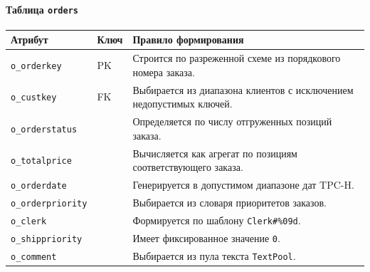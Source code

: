 \paragraph{Таблица \texttt{orders}}
\begin{center}
\small
\begin{tabular}{|p{}|p{}|p{}|}
\hline
\textbf{Атрибут} & \textbf{Ключ} & \textbf{Правило формирования} \\
\hline
\texttt{o\_orderkey} & PK & Строится по разреженной схеме из порядкового номера заказа. \\
\hline
\texttt{o\_custkey} & FK & Выбирается из диапазона клиентов с исключением недопустимых ключей. \\
\hline
\texttt{o\_orderstatus} &  & Определяется по числу отгруженных позиций заказа. \\
\hline
\texttt{o\_totalprice} &  & Вычисляется как агрегат по позициям соответствующего заказа. \\
\hline
\texttt{o\_orderdate} &  & Генерируется в допустимом диапазоне дат TPC-H. \\
\hline
\texttt{o\_orderpriority} &  & Выбирается из словаря приоритетов заказов. \\
\hline
\texttt{o\_clerk} &  & Формируется по шаблону \texttt{Clerk\#\%09d}. \\
\hline
\texttt{o\_shippriority} &  & Имеет фиксированное значение \texttt{0}. \\
\hline
\texttt{o\_comment} &  & Выбирается из пула текста \texttt{TextPool}. \\
\hline
\end{tabular}
\end{center}

